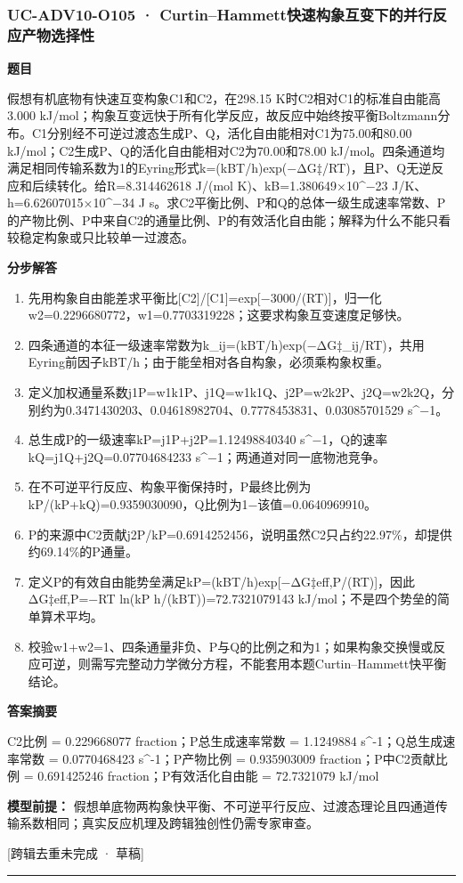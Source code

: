 \documentclass[UTF8,11pt,a4paper]{ctexart}
\begin{document}
\subsubsection*{UC-ADV10-O105 · Curtin–Hammett快速构象互变下的并行反应产物选择性}
\noindent\textbf{题目}\par
假想有机底物有快速互变构象C1和C2，在298.15 K时C2相对C1的标准自由能高3.000 kJ/mol；构象互变远快于所有化学反应，故反应中始终按平衡Boltzmann分布。C1分别经不可逆过渡态生成P、Q，活化自由能相对C1为75.00和80.00 kJ/mol；C2生成P、Q的活化自由能相对C2为70.00和78.00 kJ/mol。四条通道均满足相同传输系数为1的Eyring形式k=(kBT/h)exp(−ΔG‡/RT)，且P、Q无逆反应和后续转化。给R=8.314462618 J/(mol K)、kB=1.380649×10\textasciicircum{}−23 J/K、h=6.62607015×10\textasciicircum{}−34 J s。求C2平衡比例、P和Q的总体一级生成速率常数、P的产物比例、P中来自C2的通量比例、P的有效活化自由能；解释为什么不能只看较稳定构象或只比较单一过渡态。\par
\medskip\noindent\textbf{分步解答}
\begin{enumerate}
\item 先用构象自由能差求平衡比[C2]/[C1]=exp[−3000/(RT)]，归一化w2=0.2296680772，w1=0.7703319228；这要求构象互变速度足够快。
\item 四条通道的本征一级速率常数为k\_ij=(kBT/h)exp(−ΔG‡\_ij/RT)，共用Eyring前因子kBT/h；由于能垒相对各自构象，必须乘构象权重。
\item 定义加权通量系数j1P=w1k1P、j1Q=w1k1Q、j2P=w2k2P、j2Q=w2k2Q，分别约为0.3471430203、0.04618982704、0.7778453831、0.03085701529 s\textasciicircum{}−1。
\item 总生成P的一级速率kP=j1P+j2P=1.12498840340 s\textasciicircum{}−1，Q的速率kQ=j1Q+j2Q=0.07704684233 s\textasciicircum{}−1；两通道对同一底物池竞争。
\item 在不可逆平行反应、构象平衡保持时，P最终比例为kP/(kP+kQ)=0.9359030090，Q比例为1−该值=0.0640969910。
\item P的来源中C2贡献j2P/kP=0.6914252456，说明虽然C2只占约22.97\%，却提供约69.14\%的P通量。
\item 定义P的有效自由能势垒满足kP=(kBT/h)exp[−ΔG‡eff,P/(RT)]，因此ΔG‡eff,P=−RT ln(kP h/(kBT))=72.7321079143 kJ/mol；不是四个势垒的简单算术平均。
\item 校验w1+w2=1、四条通量非负、P与Q的比例之和为1；如果构象交换慢或反应可逆，则需写完整动力学微分方程，不能套用本题Curtin–Hammett快平衡结论。
\end{enumerate}
\noindent\textbf{答案摘要}\par
C2比例 = 0.229668077 fraction；P总生成速率常数 = 1.1249884 s\textasciicircum{}-1；Q总生成速率常数 = 0.0770468423 s\textasciicircum{}-1；P产物比例 = 0.935903009 fraction；P中C2贡献比例 = 0.691425246 fraction；P有效活化自由能 = 72.7321079 kJ/mol\par
\noindent\textbf{模型前提：}
假想单底物两构象快平衡、不可逆平行反应、过渡态理论且四通道传输系数相同；真实反应机理及跨辑独创性仍需专家审查。\par
\noindent\textcolor{red!65!black}{[跨辑去重未完成 · 草稿]} \par
\medskip\hrule\medskip
{}
\end{document}
